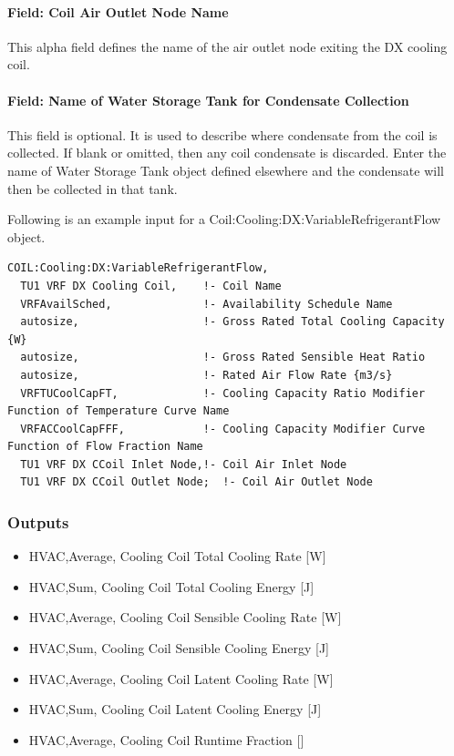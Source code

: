 \paragraph{Field: Coil Air Outlet Node Name}\label{field-coil-air-outlet-node-name}

This alpha field defines the name of the air outlet node exiting the DX cooling coil.

\paragraph{Field: Name of Water Storage Tank for Condensate Collection}\label{field-name-of-water-storage-tank-for-condensate-collection}

This field is optional. It is used to describe where condensate from the coil is collected. If blank or omitted, then any coil condensate is discarded. Enter the name of Water Storage Tank object defined elsewhere and the condensate will then be collected in that tank.

Following is an example input for a Coil:Cooling:DX:VariableRefrigerantFlow object.

\begin{lstlisting}
COIL:Cooling:DX:VariableRefrigerantFlow,
  TU1 VRF DX Cooling Coil,    !- Coil Name
  VRFAvailSched,              !- Availability Schedule Name
  autosize,                   !- Gross Rated Total Cooling Capacity {W}
  autosize,                   !- Gross Rated Sensible Heat Ratio
  autosize,                   !- Rated Air Flow Rate {m3/s}
  VRFTUCoolCapFT,             !- Cooling Capacity Ratio Modifier Function of Temperature Curve Name
  VRFACCoolCapFFF,            !- Cooling Capacity Modifier Curve Function of Flow Fraction Name
  TU1 VRF DX CCoil Inlet Node,!- Coil Air Inlet Node
  TU1 VRF DX CCoil Outlet Node;  !- Coil Air Outlet Node
\end{lstlisting}

\subsubsection{Outputs}\label{outputs-5-003}

\begin{itemize}
\item
  HVAC,Average, Cooling Coil Total Cooling Rate {[}W{]}
\item
  HVAC,Sum, Cooling Coil Total Cooling Energy {[}J{]}
\item
  HVAC,Average, Cooling Coil Sensible Cooling Rate {[}W{]}
\item
  HVAC,Sum, Cooling Coil Sensible Cooling Energy {[}J{]}
\item
  HVAC,Average, Cooling Coil Latent Cooling Rate {[}W{]}
\item
  HVAC,Sum, Cooling Coil Latent Cooling Energy {[}J{]}
\item
  HVAC,Average, Cooling Coil Runtime Fraction {[]}
\end{itemize}


